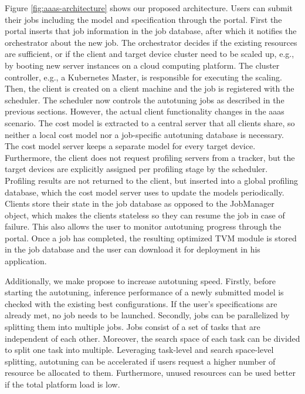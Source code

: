 Figure \ref{fig:aaas-architecture} shows our proposed architecture. Users can submit their jobs including the model and specification through the portal. First the portal inserts that job information in the job database, after which it notifies the orchestrator about the new job. The orchestrator decides if the existing resources are sufficient, or if the client and target device cluster need to be scaled up, e.g., by booting new server instances on a cloud computing platform. The cluster controller, e.g., a Kubernetes Master, is responsible for executing the scaling. Then, the client is created on a client machine and the job is registered with the scheduler.
The scheduler now controls the autotuning jobs as described in the previous sections. However, the actual client functionality changes in the \gls{aaas} scenario. The cost model is extracted to a central server that all clients share, so neither a local cost model nor a job-specific autotuning database is necessary. The cost model server keeps a separate model for every target device. Furthermore, the client does not request profiling servers from a tracker, but the target devices are explicitly assigned per profiling stage by the scheduler. Profiling results are not returned to the client, but inserted into a global profiling database, which the cost model server uses to update the models periodically. Clients store their state in the job database as opposed to the JobManager object, which makes the clients stateless so they can resume the job in case of failure. This also allows the user to monitor autotuning progress through the portal. Once a job has completed, the resulting optimized TVM module is stored in the job database and the user can download it for deployment in his application.

Additionally, we make propose to increase autotuning speed. Firstly, before starting the autotuning, inference performance of a newly submitted model is checked with the existing best configurations. If the user's specifications are already met, no job needs to be launched. Secondly, jobs can be parallelized by splitting them into multiple jobs. Jobs consist of a set of tasks that are independent of each other. Moreover, the search space of each task can be divided to split one task into multiple. Leveraging task-level and search space-level splitting, autotuning can be accelerated if users request a higher number of resource be allocated to them. Furthermore, unused resources can be used better if the total platform load is low.

